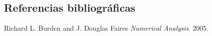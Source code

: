 \subsection{Referencias bibliogr\'aficas}
\begin{thebibliography}{9}

  Richard L. Burden and J. Douglas Faires
  \emph{Numerical Analysis}.
  2005.
\end{thebibliography}
